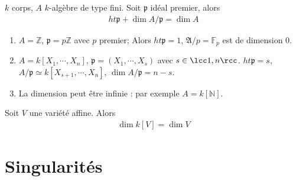             \begin{theo}
                $k$ corps, $A$ $k$-algèbre de type fini. Soit $\mathfrak{p}$ idéal premier, alors 
                \begin{align*}
                    ht \mathfrak{p} + \dim A/\mathfrak{p} = \dim A
                \end{align*}
            \end{theo}
            \begin{expl}
                \begin{enumerate}
                    \item $A = \mathbb{Z}$, $\mathfrak{p} = p \mathbb{Z}$ avec $p$ premier; Alors $ht \mathfrak{p} = 1$, $\mathfrak{A}/p = \mathbb{F}_p$ est de dimension $0$.
                    \item $A = k[X_1, \cdots, X_n]$, $\mathfrak{p} = (X_1, \cdots, X_s)$ avec $s \in \lcc 1,n \rcc$. $ht \mathfrak{p} = s$, $A/\mathfrak{p} \simeq k[X_{s+1}, \cdots, X_n]$, $\dim A/\mathfrak{p} = n-s$.
                    \item La dimension peut être infinie : par exemple $A = k[\mathbb{N}]$.
                \end{enumerate}
            \end{expl}
            \begin{theo}
                Soit $V$ une variété affine. Alors
                \begin{align*}
                    \dim k[V] = \dim V
                \end{align*}
            \end{theo}

    \section{Singularités}
